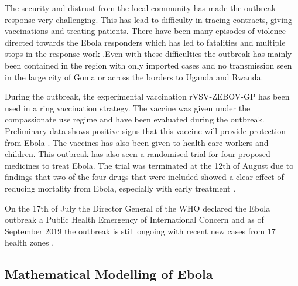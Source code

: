 \documentclass[12pt]{article}
\begin{document}
The security and distrust from the local community has made the outbreak response very challenging. This has lead to difficulty in tracing contracts, giving vaccinations and treating patients. There have been many episodes of violence directed towards the Ebola responders which has led to fatalities and multiple stops in the response work \cite{worldhealthorganizationEbolaOutbreakDRC2018c,worldhealthorganizationEbolaOutbreakDRC2019a}.Even with these difficulties the outbreak has mainly been contained in the region with only imported cases and no transmission seen in the large city of Goma or across the borders to Uganda and Rwanda. 

During the outbreak, the experimental vaccination rVSV-ZEBOV-GP has been used in a ring vaccination strategy. The vaccine was given under the compassionate use regime and have been evaluated during the outbreak. Preliminary data shows positive signs that this vaccine will provide protection from Ebola \cite{organizationPreliminaryResultsEfficacy2019}. The vaccines has also been given to health-care workers and children. This outbreak has also seen a randomised trial for four proposed medicines to treat Ebola. The trial was terminated at the 12th of August due to findings that two of the four drugs that were included showed a clear effect of reducing mortality from Ebola, especially with early treatment \cite{nationalinstituteofallergyandinfectiousdiseasesIndependentMonitoringBoard2019}.

On the 17th of July the Director General of the WHO declared the Ebola outbreak a Public Health Emergency of International Concern \cite{worldhealthorganizationEbolaOutbreakDRC2019} and as of September 2019 the outbreak is still ongoing with recent new cases from 17 health zones \cite{worldhealthorganizationEbolaOutbreakDRC2019b}. 

\subsection{Mathematical Modelling of Ebola}
\end{document}
